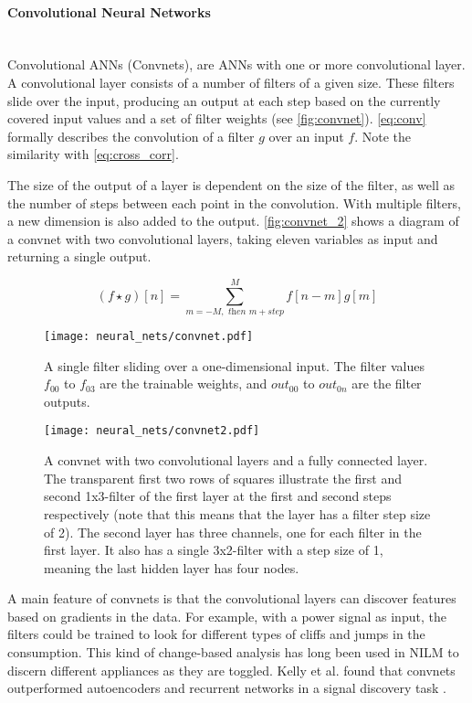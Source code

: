 \documentclass[12pt, american]{article}
\begin{document}
\paragraph{Convolutional Neural Networks}\mbox{}\\

\noindent Convolutional ANNs (Convnets), are ANNs with one or more convolutional layer. A convolutional layer consists of a number of filters of a given size. These filters slide over the input, producing an output at each step based on the currently covered input values and a set of filter weights (see \autoref{fig:convnet}). \autoref{eq:conv} formally describes the convolution of a filter $g$ over an input $f$. Note the similarity with \autoref{eq:cross_corr}. 

The size of the output of a layer is dependent on the size of the filter, as well as the number of steps between each point in the convolution. With multiple filters, a new dimension is also added to the output. \autoref{fig:convnet_2} shows a diagram of a convnet with two convolutional layers, taking eleven variables as input and returning a single output.

\begin{equation}
(f\star g)[n] = \sum\limits_{m=-M,\textit{ then }m+step}^{M} f[n-m]g[m]
\label{eq:conv}
\end{equation}

\begin{figure}[h]
\centering
\caption{A single filter sliding over a one-dimensional input. The filter values $f_{00}$ to $f_{03}$ are the trainable weights, and $out_{00}$ to $out_{0n}$ are the filter outputs.}
\texttt{[image: neural\_nets/convnet.pdf]}
\label{fig:convnet}
\end{figure}

\begin{figure}[h]
\centering
\caption{A convnet with two convolutional layers and a fully connected layer. The transparent first two rows of squares illustrate the first and second 1x3-filter of the first layer at the first and second steps respectively (note that this means that the layer has a filter step size of 2). The second layer has three channels, one for each filter in the first layer. It also has a single 3x2-filter with a step size of 1, meaning the last hidden layer has four nodes.}
\texttt{[image: neural\_nets/convnet2.pdf]}
\label{fig:convnet_2}
\end{figure}


A main feature of convnets is that the convolutional layers can discover features based on gradients in the data. For example, with a power signal as input, the filters could be trained to look for different types of cliffs and jumps in the consumption. This kind of change-based analysis has long been used in NILM to discern different appliances as they are toggled\cite{Hart1992,Sultanem1991}. Kelly et al. found that convnets outperformed autoencoders and recurrent networks in a signal discovery task \cite{Kelly2015c}.
\end{document}
